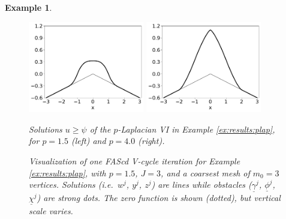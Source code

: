 \documentclass[letterpaper,final,12pt,reqno]{amsart}
\theoremstyle{cstyle}
\theoremstyle{cstyle*}
\theoremstyle{dstyle}
\newtheorem{example}[theorem]{Example}
\numberwithin{equation}{section}
\numberwithin{figure}{section}
\numberwithin{table}{section}
\numberwithin{theorem}{section}
\begin{document}
\begin{example}
\begin{figure}[ht]
\begin{center}
\includegraphics[width=0.45\textwidth]{fixfigs/plap1d1p5.pdf} \quad
\includegraphics[width=0.45\textwidth]{fixfigs/plap1d4p0.pdf}
\end{center}
\caption{Solutions $u\ge \psi$ of the $p$-Laplacian VI in Example \ref{ex:results:plap}, for $p=1.5$ (left) and $p=4.0$ (right).}
\label{fig:results:plap}
\end{figure}

\begin{figure}[ht]
\begin{center}

\end{center}
\caption{Visualization of one FAScd V-cycle iteration for Example \ref{ex:results:plap}, with $p=1.5$, $J=3$, and a coarsest mesh of $m_0=3$ vertices.  Solutions (i.e.~$w^j$, $y^j$, $z^j$) are lines while obstacles ($\underline{\gamma}^j$, $\underline{\phi}^j$, $\underline{\chi}^j$) are strong dots.  The zero function is shown (dotted), but vertical scale varies.}
\label{fig:imagesvcycle}
\end{figure}


\end{example}
\end{document}
